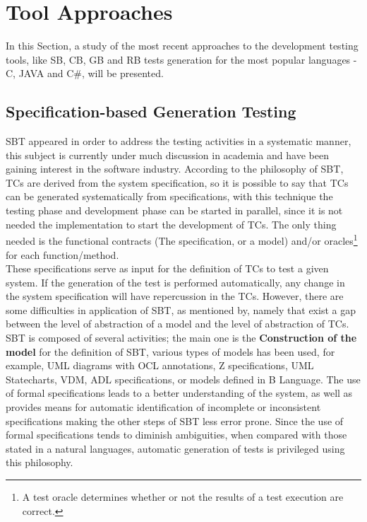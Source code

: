 \section{Tool Approaches}\label{testingapproaches}
In this Section, a study of the most recent approaches to the development testing tools,
like \ac{SB}, \ac{CB}, \ac{GB} and \ac{RB} tests generation
for the most popular languages - C, JAVA and C\#, will be presented.

\subsection{Specification-based Generation Testing}
\ac{SBT} appeared in order to address the testing activities in a systematic manner, this subject is currently under
much discussion in academia and have been gaining interest in the software industry.
According to the philosophy of \ac{SBT}, \ac{TC}s are derived from the system specification\cite{conrad:graph}, so it 
is possible to say that \ac{TC}s can be generated systematically from specifications,
with this technique the testing phase and development phase can be started in parallel, since it is not
needed the implementation to start the development of \ac{TC}s. The only thing needed is the functional contracts (The specification, or a model)
and/or oracles\footnote{A test oracle determines whether or not the results of a test execution are correct\cite{Peters95generatinga}.} for each function/method.\\

These specifications serve as input for the definition of \ac{TC}s to test a given system.
If the generation of the test is performed automatically, any change in the system specification will have repercussion in the \ac{TC}s.
However, there are some difficulties in application of \ac{SBT}, as mentioned by\cite{Bertolino04towardsanti-model-based},
namely that exist a gap between the level of abstraction of a model and the level of abstraction of \ac{TC}s.
\ac{SBT} is composed of several activities; the main one is\cite{Lindholm06model-basedtesting} the
\textbf{Construction of the model} for the definition of \ac{SBT}, various types of models has been used, for example, \ac{UML} diagrams with
\ac{OCL} annotations\cite{Simula.SE.30}, Z specifications\cite{Horcher95improvingsoftware,Stocks:1996:FST:239916.239918},
\ac{UML} Statecharts\cite{Offutt:1999:GTU:1767297.1767341}, \ac{VDM}\cite{Aichernig99automatedblack-box},
\ac{ADL} specifications\cite{Sankar94specifyingand}, or models defined in B Language\cite{Legeard:2002:ABT:647541.730142,Bernard:2004:GTS:1134155.1134156}.
The use of formal specifications leads to a better understanding of the system, as well as provides means for automatic identification of incomplete
or inconsistent specifications making the other steps of \ac{SBT} less error prone.
Since the use of formal specifications tends to diminish ambiguities, when compared
with those stated in a natural languages, automatic generation of tests is privileged using this philosophy.

